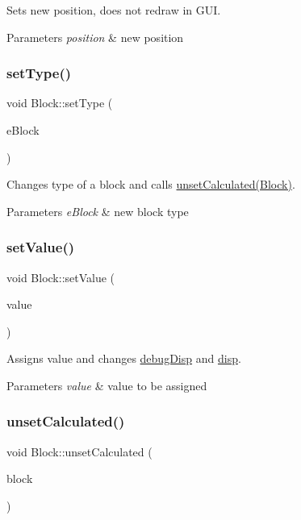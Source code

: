 Sets new position, does not redraw in G\+UI. 
\begin{DoxyParams}{Parameters}
{\em position} & new position \\
\hline
\end{DoxyParams}
\mbox{\label{classBlock_a931b0465363ea2ec445f817940a78abd}} 
\subsubsection{\texorpdfstring{set\+Type()}{setType()}}
{\footnotesize\ttfamily void Block\+::set\+Type (\begin{DoxyParamCaption}\item[{E\+Block}]{e\+Block }\end{DoxyParamCaption})}

Changes type of a block and calls \hyperlink{}{unset\+Calculated(\+Block)}.


\begin{DoxyParams}{Parameters}
{\em e\+Block} & new block type \\
\hline
\end{DoxyParams}
\mbox{\label{classBlock_acabb5bf7f41bc16338b4efde5a760703}} 
\subsubsection{\texorpdfstring{set\+Value()}{setValue()}}
{\footnotesize\ttfamily void Block\+::set\+Value (\begin{DoxyParamCaption}\item[{double}]{value }\end{DoxyParamCaption})}

Assigns value and changes \hyperlink{}{debug\+Disp} and \hyperlink{classBlock_a1d3b391e9531eb8bc0b0362730d4c53d}{disp}. 
\begin{DoxyParams}{Parameters}
{\em value} & value to be assigned \\
\hline
\end{DoxyParams}
\mbox{\label{classBlock_ab76d443f7898f82c4ad4cb124375a76c}} 
\subsubsection{\texorpdfstring{unset\+Calculated()}{unsetCalculated()}}
{\footnotesize\ttfamily void Block\+::unset\+Calculated (\begin{DoxyParamCaption}\item[{\hyperlink{classBlock}{Block} $\ast$}]{block }\end{DoxyParamCaption})\hspace{0.3cm}{\ttfamily [static]}}

